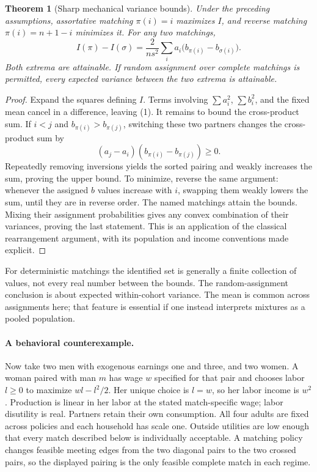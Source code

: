 \documentclass[11pt]{article}
\newtheorem{theorem}{Theorem}
\theoremstyle{definition}
\begin{document}
\begin{theorem}[Sharp mechanical variance bounds]
Under the preceding assumptions, assortative matching $\pi(i)=i$ maximizes $I$, and reverse matching $\pi(i)=n+1-i$ minimizes it. For any two matchings,
\[
 I(\pi)-I(\sigma)
 =\frac{2}{ns^2}\sum_i a_i\bigl(b_{\pi(i)}-b_{\sigma(i)}\bigr).
 \tag{1}
\]
Both extrema are attainable. If random assignment over complete matchings is permitted, every expected variance between the two extrema is attainable.
\end{theorem}
\begin{proof}
Expand the squares defining $I$. Terms involving $\sum a_i^2$, $\sum b_i^2$, and the fixed mean cancel in a difference, leaving (1). It remains to bound the cross-product sum. If $i<j$ and $b_{\pi(i)}>b_{\pi(j)}$, switching these two partners changes the cross-product sum by
\[
 (a_j-a_i)(b_{\pi(i)}-b_{\pi(j)})\geq0.
\]
Repeatedly removing inversions yields the sorted pairing and weakly increases the sum, proving the upper bound. To minimize, reverse the same argument: whenever the assigned $b$ values increase with $i$, swapping them weakly lowers the sum, until they are in reverse order. The named matchings attain the bounds. Mixing their assignment probabilities gives any convex combination of their variances, proving the last statement. This is an application of the classical rearrangement argument, with its population and income conventions made explicit.
\end{proof}

For deterministic matchings the identified set is generally a finite collection of values, not every real number between the bounds. The random-assignment conclusion is about expected within-cohort variance. The mean is common across assignments here; that feature is essential if one instead interprets mixtures as a pooled population.

\paragraph{A behavioral counterexample.}
Now take two men with exogenous earnings one and three, and two women. A woman paired with man $m$ has wage $w$ specified for that pair and chooses labor $l\geq0$ to maximize $wl-l^2/2$. Her unique choice is $l=w$, so her labor income is $w^2$. Production is linear in her labor at the stated match-specific wage; labor disutility is real. Partners retain their own consumption. All four adults are fixed across policies and each household has scale one. Outside utilities are low enough that every match described below is individually acceptable. A matching policy changes feasible meeting edges from the two diagonal pairs to the two crossed pairs, so the displayed pairing is the only feasible complete match in each regime.
\end{document}
